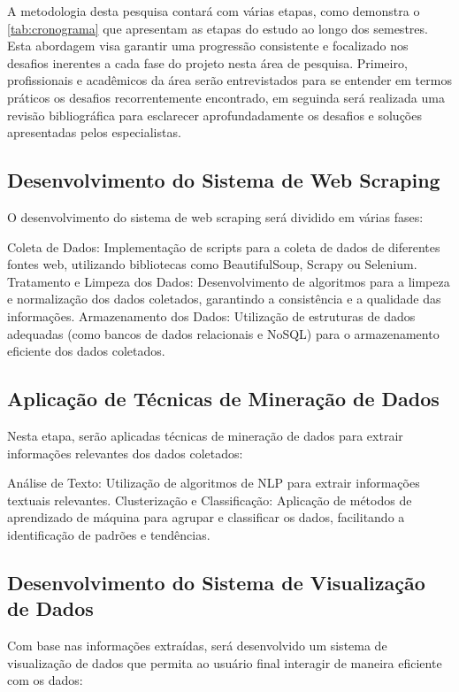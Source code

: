 A metodologia desta pesquisa contará com várias etapas, como demonstra o \autoref{tab:cronograma} que apresentam as etapas do estudo ao longo dos semestres. Esta abordagem visa garantir uma progressão consistente e focalizado nos desafios inerentes a cada fase do projeto nesta área de pesquisa. Primeiro, profissionais e acadêmicos da área serão entrevistados para se entender em termos práticos os desafios recorrentemente encontrado, em seguinda será realizada uma revisão bibliográfica para esclarecer aprofundadamente os desafios e soluções apresentadas pelos especialistas.



\subsection{Desenvolvimento do Sistema de Web Scraping}

O desenvolvimento do sistema de web scraping será dividido em várias fases:

Coleta de Dados: Implementação de scripts para a coleta de dados de diferentes fontes web, utilizando bibliotecas como BeautifulSoup, Scrapy ou Selenium.
Tratamento e Limpeza dos Dados: Desenvolvimento de algoritmos para a limpeza e normalização dos dados coletados, garantindo a consistência e a qualidade das informações.
Armazenamento dos Dados: Utilização de estruturas de dados adequadas (como bancos de dados relacionais e NoSQL) para o armazenamento eficiente dos dados coletados.
\subsection{Aplicação de Técnicas de Mineração de Dados}

Nesta etapa, serão aplicadas técnicas de mineração de dados para extrair informações relevantes dos dados coletados:

Análise de Texto: Utilização de algoritmos de NLP para extrair informações textuais relevantes.
Clusterização e Classificação: Aplicação de métodos de aprendizado de máquina para agrupar e classificar os dados, facilitando a identificação de padrões e tendências.
\subsection{Desenvolvimento do Sistema de Visualização de Dados}

Com base nas informações extraídas, será desenvolvido um sistema de visualização de dados que permita ao usuário final interagir de maneira eficiente com os dados:

